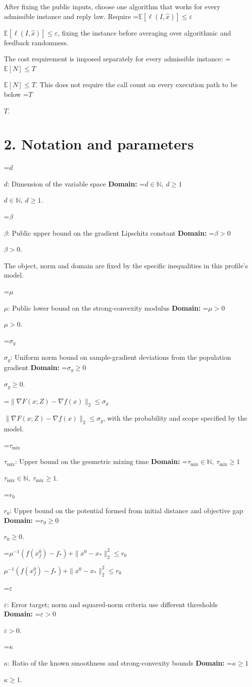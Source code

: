 \documentclass[10pt,a4paper]{article}
\newcommand{\AtlasMath}[1]{\par\begingroup\centering\setbox0=\hbox{$\displaystyle #1$}\ifdim\wd0>1.4\linewidth\typeout{ATLAS WIDE FORMULA: \the\wd0}\fi\ifdim\wd0>\linewidth\resizebox{\linewidth}{!}{\box0}\else\box0\fi\par\endgroup}
\newcommand{\AtlasInlineMath}[1]{\begingroup\setbox0=\hbox{$#1$}\ifdim\wd0>.4\linewidth\endgroup\AtlasMath{#1}\else\endgroup$#1$\fi}
\begin{document}
After fixing the public inputs, choose one algorithm that works for every admissible instance and reply law. Require \AtlasInlineMath{\mathbb{E}[\ell(I,\widehat{x})]\le \varepsilon}, fixing the instance before averaging over algorithmic and feedback randomness.

The cost requirement is imposed separately for every admissible instance: \AtlasInlineMath{\mathbb{E}[N]\le T}. This does not require the call count on every execution path to be below \AtlasInlineMath{T}.

\section{2. Notation and parameters}
\AtlasInlineMath{d}: Dimension of the variable space \textbf{Domain:} \AtlasInlineMath{d\in\mathbb{N},\ d\ge1}.

\AtlasInlineMath{\beta}: Public upper bound on the gradient Lipschitz constant \textbf{Domain:} \AtlasInlineMath{\beta>0}.

The object, norm and domain are fixed by the specific inequalities in this profile's model.

\AtlasInlineMath{\mu}: Public lower bound on the strong-convexity modulus \textbf{Domain:} \AtlasInlineMath{\mu>0}.

\AtlasInlineMath{\sigma_g}: Uniform norm bound on sample-gradient deviations from the population gradient \textbf{Domain:} \AtlasInlineMath{\sigma_g\ge0}.

\AtlasInlineMath{\|\nabla F(x;Z)-\nabla f(x)\|_2\le\sigma_g}, with the probability and scope specified by the model.

\AtlasInlineMath{\tau_{\mathrm{mix}}}: Upper bound on the geometric mixing time \textbf{Domain:} \AtlasInlineMath{\tau_{\mathrm{mix}}\in\mathbb{N},\ \tau_{\mathrm{mix}}\ge1}.

\AtlasInlineMath{r_0}: Upper bound on the potential formed from initial distance and objective gap \textbf{Domain:} \AtlasInlineMath{r_0\ge0}.

\AtlasInlineMath{\mu^{-1}(f(x_f^0)-f_*)+\|x^0-x_*\|_2^2\le r_0}

\AtlasInlineMath{\varepsilon}: Error target; norm and squared-norm criteria use different thresholds \textbf{Domain:} \AtlasInlineMath{\varepsilon>0}.

\AtlasInlineMath{\kappa}: Ratio of the known smoothness and strong-convexity bounds \textbf{Domain:} \AtlasInlineMath{\kappa\ge1}.
\end{document}
